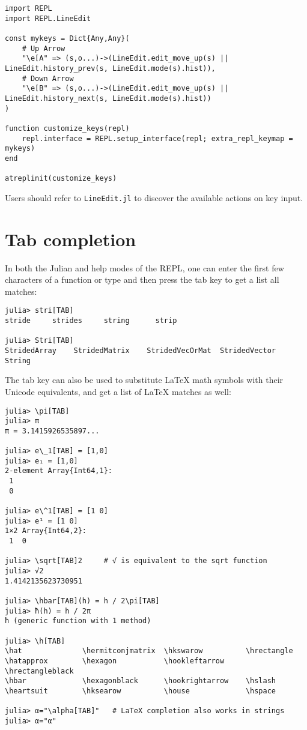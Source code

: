 \begin{verbatim}
import REPL
import REPL.LineEdit

const mykeys = Dict{Any,Any}(
    # Up Arrow
    "\e[A" => (s,o...)->(LineEdit.edit_move_up(s) || LineEdit.history_prev(s, LineEdit.mode(s).hist)),
    # Down Arrow
    "\e[B" => (s,o...)->(LineEdit.edit_move_up(s) || LineEdit.history_next(s, LineEdit.mode(s).hist))
)

function customize_keys(repl)
    repl.interface = REPL.setup_interface(repl; extra_repl_keymap = mykeys)
end

atreplinit(customize_keys)
\end{verbatim}



Users should refer to \texttt{LineEdit.jl} to discover the available actions on key input.



\hypertarget{9567689438493430677}{}


\section{Tab completion}



In both the Julian and help modes of the REPL, one can enter the first few characters of a function or type and then press the tab key to get a list all matches:




\begin{verbatim}
julia> stri[TAB]
stride     strides     string      strip

julia> Stri[TAB]
StridedArray    StridedMatrix    StridedVecOrMat  StridedVector    String
\end{verbatim}



The tab key can also be used to substitute LaTeX math symbols with their Unicode equivalents, and get a list of LaTeX matches as well:




\begin{verbatim}
julia> \pi[TAB]
julia> π
π = 3.1415926535897...

julia> e\_1[TAB] = [1,0]
julia> e₁ = [1,0]
2-element Array{Int64,1}:
 1
 0

julia> e\^1[TAB] = [1 0]
julia> e¹ = [1 0]
1×2 Array{Int64,2}:
 1  0

julia> \sqrt[TAB]2     # √ is equivalent to the sqrt function
julia> √2
1.4142135623730951

julia> \hbar[TAB](h) = h / 2\pi[TAB]
julia> ħ(h) = h / 2π
ħ (generic function with 1 method)

julia> \h[TAB]
\hat              \hermitconjmatrix  \hkswarow          \hrectangle
\hatapprox        \hexagon           \hookleftarrow     \hrectangleblack
\hbar             \hexagonblack      \hookrightarrow    \hslash
\heartsuit        \hksearow          \house             \hspace

julia> α="\alpha[TAB]"   # LaTeX completion also works in strings
julia> α="α"
\end{verbatim}



